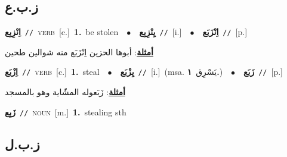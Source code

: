 \documentclass[10pt,a4paper,twoside]{article} %
\begin{document}
\begin{multicols}{2}
{{{{{{\vspace{-3mm}
\subsection*{\color{blue}\foreignlanguage{arabic}{ز.ب.ع}\color{blue}{}} 

{\setlength\topsep{0pt}\textbf{\foreignlanguage{arabic}{اِنْزِبِع}}\ {\color{gray}\texttt{//}\color{black}}\ \textsc{verb}\ [c.]\ \textbf{1.}~be stolen\ \ $\bullet$\ \ \setlength\topsep{0pt}\textbf{\foreignlanguage{arabic}{يِنْزِبِع}}\ {\color{gray}\texttt{//}\color{black}}\ [i.]\ \ $\bullet$\ \ \setlength\topsep{0pt}\textbf{\foreignlanguage{arabic}{اِنْزَبَع}}\ {\color{gray}\texttt{//}\color{black}}\ [p.]\  \begin{flushright}\color{gray}\foreignlanguage{arabic}{\textbf{\underline{\foreignlanguage{arabic}{أمثلة}}}: أبوها الحزين اِنْزَبَع منه شوالين طحين}\end{flushright}\color{black}} \vspace{2mm}

{\setlength\topsep{0pt}\textbf{\foreignlanguage{arabic}{اِزْبَع}}\ {\color{gray}\texttt{//}\color{black}}\ \textsc{verb}\ [c.]\ \textbf{1.}~steal\ \ $\bullet$\ \ \setlength\topsep{0pt}\textbf{\foreignlanguage{arabic}{يِزْبَع}}\ {\color{gray}\texttt{//}\color{black}}\ [i.]\ \color{gray}(msa. \foreignlanguage{arabic}{يَسْرِق}~\foreignlanguage{arabic}{\textbf{١.}})\color{black}\ \ $\bullet$\ \ \setlength\topsep{0pt}\textbf{\foreignlanguage{arabic}{زَبَع}}\ {\color{gray}\texttt{//}\color{black}}\ [p.]\  \begin{flushright}\color{gray}\foreignlanguage{arabic}{\textbf{\underline{\foreignlanguage{arabic}{أمثلة}}}: زَبَعوله المشّاية وهو بالمسجد}\end{flushright}\color{black}} \vspace{2mm}

{\setlength\topsep{0pt}\textbf{\foreignlanguage{arabic}{زَبِع}}\ {\color{gray}\texttt{//}\color{black}}\ \textsc{noun}\ [m.]\ \textbf{1.}~stealing sth\ 

\vspace{-3mm}
\subsection*{\color{blue}\foreignlanguage{arabic}{ز.ب.ل}\color{blue}{}} 

}}}}}}}
\end{multicols}
\end{document}

